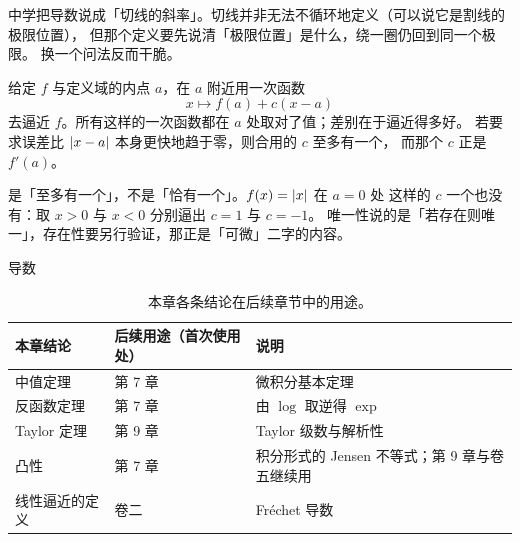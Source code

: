 中学把导数说成「切线的斜率」。切线并非无法不循环地定义（可以说它是割线的极限位置），
但那个定义要先说清「极限位置」是什么，绕一圈仍回到同一个极限。
换一个问法反而干脆。

给定 \(f\) 与定义域的内点 \(a\)，在 \(a\) 附近用一次函数
\[
  x \longmapsto f(a) + c(x-a)
\]
去逼近 \(f\)。所有这样的一次函数都在 \(a\) 处取对了值；差别在于逼近得多好。
若要求误差比 \(\lvert x-a\rvert\) 本身更快地趋于零，则合用的 \(c\) 至多有一个，
而那个 \(c\) 正是 \(f'(a)\)。

\begin{pitfall}
  是「至多有一个」，不是「恰有一个」。\(f(x)=\lvert x\rvert\) 在 \(a=0\) 处
  这样的 \(c\) 一个也没有：取 \(x>0\) 与 \(x<0\) 分别逼出 \(c=1\) 与 \(c=-1\)。
  唯一性说的是「若存在则唯一」，存在性要另行验证，那正是「可微」二字的内容。
\end{pitfall}

\begin{concept}{导数}
\end{concept}

\begin{table}[htbp]
  \centering
  \caption{本章各条结论在后续章节中的用途。}
  \label{tab:ch6-where-used}
  \begin{tabular}{@{}llp{5.2cm}@{}}
    \toprule
    本章结论 & 后续用途（首次使用处） & 说明 \\
    \midrule
    中值定理     & 第 7 章 & 微积分基本定理 \\
    反函数定理   & 第 7 章 & 由 \(\log\) 取逆得 \(\exp\) \\
    Taylor 定理  & 第 9 章 & Taylor 级数与解析性 \\
    凸性         & 第 7 章 & 积分形式的 Jensen 不等式；第 9 章与卷五继续用 \\
    线性逼近的定义 & 卷二   & Fréchet 导数 \\
    \bottomrule
  \end{tabular}
\end{table}

